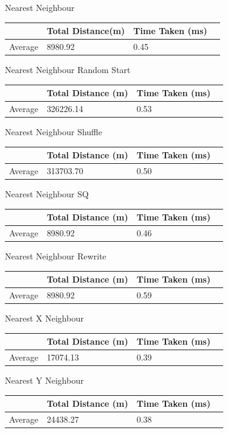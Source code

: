 \documentclass[conference,backref=page]{acmsiggraph}
\begin{document}
\begin{center}	
	
	Nearest Neighbour
	\begin{tabular}{| l | l | l | l |}
		\hline
		& Total Distance(m)& Time Taken (ms)\\ \hline
		Average & 8980.92 & 0.45 \\ \hline
	\end{tabular}
	
	Nearest Neighbour Random Start
	\begin{tabular}{| l | l | l | l |}
		\hline
		& Total Distance (m) & Time Taken (ms)\\ \hline
		Average & 326226.14 & 0.53 \\ \hline
	\end{tabular}
	
	Nearest Neighbour Shuffle
	\begin{tabular}{| l | l | l | l |}
		\hline
		& Total Distance (m) & Time Taken (ms)\\ \hline
		Average & 313703.70 & 0.50 \\ \hline
	\end{tabular}
	
	Nearest Neighbour SQ
	\begin{tabular}{| l | l | l | l |}
		\hline
		& Total Distance (m) & Time Taken (ms)\\ \hline
		Average & 8980.92 & 0.46 \\ \hline
	\end{tabular}
	
	Nearest Neighbour Rewrite
	\begin{tabular}{| l | l | l | l |}
		\hline
		& Total Distance (m) & Time Taken (ms)\\ \hline
		Average & 8980.92 & 0.59 \\ \hline
	\end{tabular}
	
	
	Nearest X Neighbour	
	\begin{tabular}{| l | l | l | l |}
		\hline
		& Total Distance (m) & Time Taken (ms)\\ \hline
		Average & 17074.13 & 0.39 \\ \hline	
	\end{tabular}
	
	Nearest Y Neighbour	
	\begin{tabular}{| l | l | l | l |}
		\hline
		& Total Distance (m) & Time Taken (ms)\\ \hline
		Average & 24438.27 & 0.38 \\ \hline
	\end{tabular}
\end{center}
\end{document}
